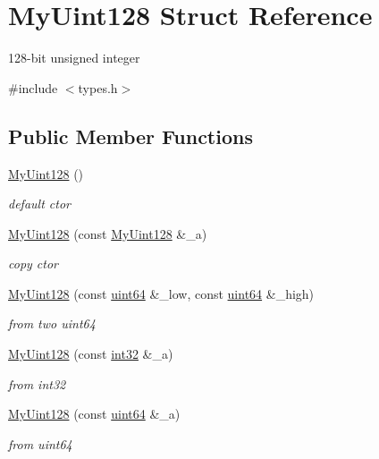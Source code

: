 \hypertarget{structMyUint128}{\section{My\-Uint128 Struct Reference}
\label{structMyUint128}
}


128-\/bit unsigned integer  




{\ttfamily \#include $<$types.\-h$>$}

\subsection*{Public Member Functions}
\begin{DoxyCompactItemize}
\item 
\hyperlink{structMyUint128_a842042314a01bf6d9c7eb8e798fd3198}{My\-Uint128} ()
\begin{DoxyCompactList}\small\item\em default ctor \end{DoxyCompactList}\item 
\hyperlink{structMyUint128_a95123e5de2ff59222dc570760a7849a3}{My\-Uint128} (const \hyperlink{structMyUint128}{My\-Uint128} \&\-\_\-a)
\begin{DoxyCompactList}\small\item\em copy ctor \end{DoxyCompactList}\item 
\hyperlink{structMyUint128_aa2defd40f51042b42507089b6f0fc4d9}{My\-Uint128} (const \hyperlink{types_8h_aeefdb2888fa3c58f2454ef004419e6a5}{uint64} \&\-\_\-low, const \hyperlink{types_8h_aeefdb2888fa3c58f2454ef004419e6a5}{uint64} \&\-\_\-high)
\begin{DoxyCompactList}\small\item\em from two uint64 \end{DoxyCompactList}\item 
\hyperlink{structMyUint128_a5d5fff606c04e8ead641e0ded7f9db56}{My\-Uint128} (const \hyperlink{types_8h_aae6ad039f09c0676db11bd114136a3fa}{int32} \&\-\_\-a)
\begin{DoxyCompactList}\small\item\em from int32 \end{DoxyCompactList}\item 
\hyperlink{structMyUint128_aa288a0a61ab36f0eed9dc60f36bc8519}{My\-Uint128} (const \hyperlink{types_8h_aeefdb2888fa3c58f2454ef004419e6a5}{uint64} \&\-\_\-a)
\begin{DoxyCompactList}\small\item\em from uint64 \end{DoxyCompactList}\item 

\end{DoxyCompactItemize}
